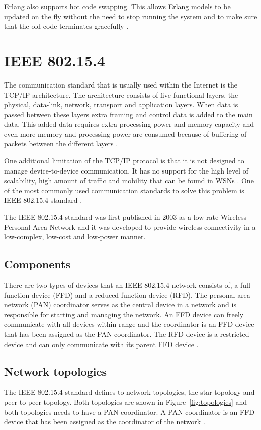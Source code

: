 Erlang also supports hot code swapping. This allows Erlang models to be updated on the fly without the need to stop running the system and to make sure that the old code terminates gracefully \citep{sivieri2012erlang}.

\section{IEEE 802.15.4}
The communication standard that is usually used within the Internet is the TCP/IP architecture. The architecture consists of five functional layers, the physical, data-link, network, transport and application layers. When data is passed between these layers extra framing and control data is added to the main data. This added data requires extra processing power and memory capacity and even more memory and processing power are consumed because of buffering of packets between the different layers \citep{BELLO201752}.

One additional limitation of the TCP/IP protocol is that it is not designed to manage device-to-device communication. It has no support for the high level of scalability, high amount of traffic and mobility that can be found in WSNs \citep{BELLO201752}. One of the most commonly used communication standards to solve this problem is IEEE 802.15.4 standard \citep{yang2014internet}.

The IEEE 802.15.4 standard was first published in 2003 as a low-rate Wireless Personal Area Network and it was developed to provide wireless connectivity in a low-complex, low-cost and low-power manner. 

\subsection{Components}
There are two types of devices that an IEEE 802.15.4 network consists of, a full-function device (FFD) and a reduced-function device (RFD). The personal area network (PAN) coordinator serves as the central device in a network and is responsible for starting and managing the network. An FFD device can freely communicate with all devices within range and the coordinator is an FFD device that has been assigned as the PAN coordinator. The RFD device is a restricted device and can only communicate with its parent FFD device \citep{yang2014internet}.

\subsection{Network topologies}
The IEEE 802.15.4 standard defines to network topologies, the star topology and peer-to-peer topology. Both topologies are shown in Figure~\ref{fig:topologies} and both topologies needs to have a PAN coordinator. A PAN coordinator is an FFD device that has been assigned as the coordinator of the network \citep{kohvakka2006performance}.

